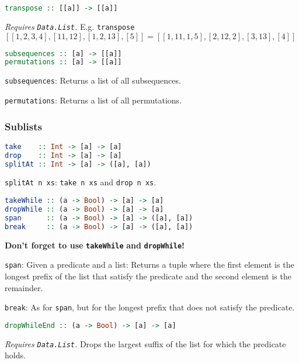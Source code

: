 \documentclass[twocolumn,english]{article}
\begin{document}
\begin{lstlisting}[language=Haskell,frame=single]
transpose :: [[a]] -> [[a]]
\end{lstlisting}


\emph{Requires }\texttt{\emph{Data.List}}\emph{.} E.g. \texttt{transpose}
$[[1,2,3,4],[11,12],[1,2,13],[5]]=[[1,11,1,5],[2,12,2],[3,13],[4]]$

\begin{lstlisting}[language=Haskell,frame=single]
subsequences :: [a] -> [[a]]
permutations :: [a] -> [[a]]
\end{lstlisting}


\texttt{subsequences}: Returns a list of all subsequences.

\texttt{permutations}: Returns a list of all permutations.


\subsubsection{Sublists}

\begin{lstlisting}[language=Haskell,frame=single]
take    :: Int -> [a] -> [a]
drop    :: Int -> [a] -> [a]
splitAt :: Int -> [a] -> ([a], [a])
\end{lstlisting}


\texttt{splitAt n xs}: \texttt{take n xs} and \texttt{drop n xs}.

\begin{lstlisting}[language=Haskell,frame=single]
takeWhile :: (a -> Bool) -> [a] -> [a]
dropWhile :: (a -> Bool) -> [a] -> [a]
span      :: (a -> Bool) -> [a] -> ([a], [a])
break     :: (a -> Bool) -> [a] -> ([a], [a])
\end{lstlisting}


\textbf{Don't forget to use }\texttt{\textbf{takeWhile}}\textbf{ and
}\texttt{\textbf{dropWhile}}\textbf{!}

\texttt{span}: Given a predicate and a list: Returns a tuple where
the first element is the longest prefix of the list that satisfy the
predicate and the second element is the remainder.

\texttt{break}: As for \texttt{span}, but for the longest prefix that
does not satisfy the predicate.

\begin{lstlisting}[language=Haskell,frame=single]
dropWhileEnd :: (a -> Bool) -> [a] -> [a]
\end{lstlisting}


\emph{Requires }\texttt{\emph{Data.List}}\emph{. }Drops the largest
suffix of the list for which the predicate holds.
\end{document}
